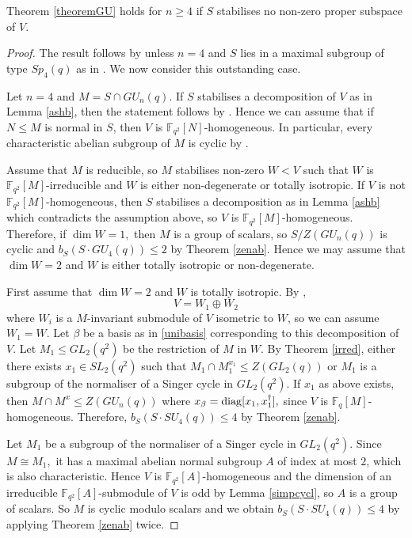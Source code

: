 \begin{Th}
\label{GU4sp}
Theorem {\rm \ref{theoremGU}} holds for $n \ge 4$ if $S$ stabilises no non-zero proper subspace of $V$.
\end{Th}
\begin{proof}
 The result follows by \cite[Theorem 1.1]{burness} unless $n=4$ and $S$ lies in a maximal subgroup of type $Sp_4(q)$ as in \cite[Table 1]{burness}. We now consider this outstanding case. 




Let $n=4$ and $M=S \cap GU_n(q).$
If $S$ stabilises a decomposition of $V$ as in Lemma \ref{ashb}, then the statement follows by \cite[Table 2]{burness}.  Hence we can assume that if $N\le M$ is normal in $S$, then $V$ is $\mathbb{F}_{q^2}[N]$-homogeneous. In particular, every characteristic abelian  subgroup of $M$ is cyclic by \cite[Lemma 0.5]{manz}. 

Assume that $M$ is reducible, so $M$ stabilises non-zero $W<V$ such that $W$ is $\mathbb{F}_{q^2}[M]$-irreducible and $W$ is either non-degenerate or totally isotropic. If $V$ is not $\mathbb{F}_{q^2}[M]$-homogeneous, then $S$ stabilises a decomposition as in Lemma \ref{ashb} which contradicts the assumption above, so   $V$ is  $\mathbb{F}_{q^2}[M]$-homogeneous. Therefore, if $\dim W=1,$ then $M$ is a group of scalars, so $S/Z(GU_n(q))$ is cyclic and $b_S(S \cdot GU_4(q)) \le 2$ by Theorem \ref{zenab}. Hence we may assume that $\dim W=2$ and $W$ is either totally isotropic or non-degenerate.

First assume that $\dim W=2$ and $W$ is totally isotropic. By \cite[(5.2)]{asch}, 
$$V=W_1 \oplus W_2$$ where $W_i$ is a $M$-invariant submodule of $V$ isometric to $W$, so we can assume $W_1=W.$ Let $\beta$ be a basis as in \eqref{unibasis} corresponding to this decomposition of $V$. Let $M_1 \le GL_2(q^2)$ be the restriction of $M$ in $W.$ By Theorem \ref{irred}, either there exists $x_1 \in SL_2(q^2)$ such that $M_1 \cap M_1^{x_1} \le Z(GL_2(q))$ or $M_1$ is a subgroup of the normaliser of a Singer cycle in $GL_2(q^2).$ If $x_1$ as above exists, then $M \cap M^x\le Z(GU_n(q))$ where $x_{\beta}=\mathrm{diag}[x_1, x_1^{\dagger}],$ since $V$ is $\mathbb{F}_q[M]$-homogeneous. Therefore, $b_S(S \cdot SU_4(q)) \le 4$ by Theorem \ref{zenab}.

Let $M_1$ be  a subgroup of the normaliser of a Singer cycle in $GL_2(q^2).$ Since $M  \cong M_1,$ it has a maximal abelian normal subgroup $A$ of index at most $2$, which is also characteristic. Hence $V$ is $\mathbb{F}_{q^2}[A]$-homogeneous and the dimension of an irreducible $\mathbb{F}_{q^2}[A]$-submodule of $V$ is odd by Lemma \ref{simpcycl}, so $A$ is a group of scalars. So $M$ is cyclic modulo scalars and we obtain $b_S(S \cdot SU_4(q)) \le 4$ by applying Theorem \ref{zenab} twice.




\end{proof}
